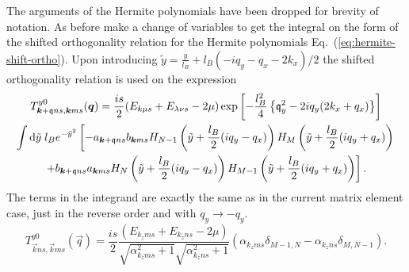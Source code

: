 The arguments of the Hermite polynomials have been dropped for brevity of notation.
As before make a change of variables to get the integral on the form of the shifted orthogonality relation for the Hermite polynomials Eq.~(\ref{eq:hermite-shift-ortho}).
Upon introducing $\tilde{y} = \frac{y}{l_{B}} + l_B( -iq_y - q_x - 2k_x) / 2$ the shifted orthogonality relation is used on the expression
{\setlength\multlinegap{0pt}  %
\begin{multline}
  \label{eq:76}
    T^{y 0}_{\bm{k}+\mathfrak{q}ns, \bm{k}ms} (\bm{q})
    = \frac{i s}{2}
    (E_{k \mu s} + E_{\lambda \nu s}- 2\mu )
    \exp \left[
      -\frac{l_B^2}{4} \left\{ \mathfrak{q}_y^2- 2 i q_y (2 k_x + q_x) \right\}
    \right]\\
    \int \mathrm{d}\tilde{y} \; l_B
    e^{-\tilde{y}^2}
     \left[
      - a_{\bm{k}+\mathfrak{q} ns} b_{\bm{k} ms}
      H_{N-1} \left( \tilde{y} + \frac{l_B}{2} ( iq_y - q_x) \right)
      H_M \left( \tilde{y} + \frac{l_B}{2} (iq_y + q_x) \right)\right.\\
       \left.+ b_{\bm{k}+\mathfrak{q} ns} a_{\bm{k}ms}
      H_N \left( \tilde{y} + \frac{l_B}{2} ( iq_y - q_x) \right)
      H_{M-1} \left( \tilde{y} + \frac{l_B}{2} (iq_y + q_x) \right)
    \right].
\end{multline}
}
The terms in the integrand are exactly the same as in the current matrix element case, just in the reverse order and with $q_y \to -q_y$.
\begin{equation}
  \label{eq:77}
  T^{y 0}_{\vec{k} ns, \vec{k}ms} (\vec{q})
  = \frac{i s}{2}
  \frac{
    (E_{k_z m s} + E_{k_z n s}- 2\mu )
  }{
    \sqrt{\alpha_{k_zms}^2 +1}
    \sqrt{\alpha_{k_zns}^2 + 1}
  }
  \left(
    \alpha_{k_z m s}
    \delta_{M-1, N}
    -
    \alpha_{k_z n s}
    \delta_{M, N-1}
  \right).
\end{equation}
